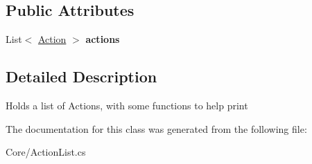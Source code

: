 \subsection*{Public Attributes}
\begin{DoxyCompactItemize}
\item 
\hypertarget{class_proto_test_1_1_golem_1_1_core_1_1_action_list_affa1939ceb68a43e5cb70d47e46af33b}{List$<$ \hyperlink{class_proto_test_1_1_golem_1_1_core_1_1_action_list_1_1_action}{Action} $>$ {\bfseries actions}}\label{class_proto_test_1_1_golem_1_1_core_1_1_action_list_affa1939ceb68a43e5cb70d47e46af33b}

\end{DoxyCompactItemize}


\subsection{Detailed Description}
Holds a list of Actions, with some functions to help print 



The documentation for this class was generated from the following file\-:\begin{DoxyCompactItemize}
\item 
Core/Action\-List.\-cs\end{DoxyCompactItemize}
